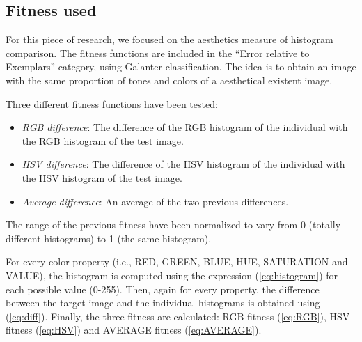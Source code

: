 \documentclass[conference]{IEEEtran}
\begin{document}
\subsection{Fitness used}
For this piece of research, we focused on the aesthetics measure of histogram comparison. The fitness functions are included in the ``Error relative to Exemplars'' category, using Galanter \cite{galanter2012computational} classification. The idea is to obtain an image with the same proportion of tones and colors of a aesthetical existent image.

Three different fitness functions have been tested:
\begin{itemize}
\item {\em RGB difference}: The difference of the RGB histogram of the individual with the RGB histogram of the test image.
\item {\em HSV difference}: The difference of the HSV histogram of the individual with the HSV histogram of the test image.
\item {\em Average difference}: An average of the two previous differences.
\end{itemize}

The range of the previous fitness have been normalized to vary from 0 (totally different histograms) to 1 (the same histogram).

For every color property (i.e., RED, GREEN, BLUE, HUE, SATURATION and VALUE), the histogram is computed using the expression (\ref{eq:histogram}) for each possible value (0-255). Then, again for every property, the difference between the target image and the individual histograms is obtained using (\ref{eq:diff}). Finally, the three fitness are calculated: RGB fitness (\ref{eq:RGB}), HSV fitness (\ref{eq:HSV}) and AVERAGE fitness (\ref{eq:AVERAGE}).
\end{document}
